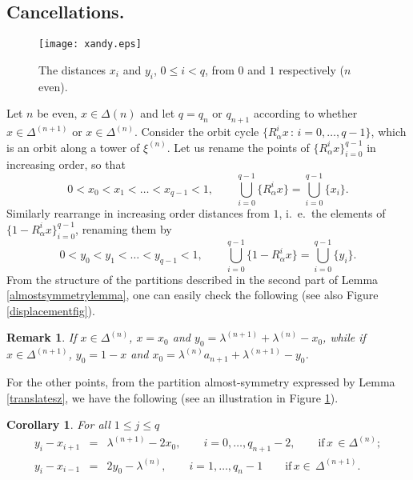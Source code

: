 \documentclass{conm-p-l}
\numberwithin{equation}{section}
\newtheorem{cor}[theorem]{Corollary}
\newtheorem{rem}[theorem]{Remark}
\begin{document}
\subsection{Cancellations.}\label{cancellations}
\begin{figure}
\centering
\texttt{[image: xandy.eps]}
\caption{The distances $x_i$ and $y_i$, $0\leq i < q$, from $0$ and $1$ respectively ($n$ even).\label{xandy}}
\end{figure}
Let $n$ be even, ${x}\in \Delta{(n)}$ and let $q=q_{n}$ or $q_{n+1}$ according to whether
${x}\in \Delta^{(n+1)}$ or ${x}\in \Delta^{(n)}$.  Consider the orbit cycle $\{R_{\alpha}^i {x}
{\, : \, } i=0, \dots, q-1\}$, which is an orbit along a tower of $\xi^{(n)}$. Let us rename the points of  $\{R_{\alpha}^i {x}\}_{i=0}^{q-1}$ in
increasing order, so that
\begin{equation*} 0<{x}_0 <x_1< \dots < x_{q-1}<1, \qquad \bigcup_{i=0}^{q-1} \{ R_{\alpha}^i
{x} \} = \bigcup_{i=0}^{q-1} \{ x_i \}.
\end{equation*}
Similarly rearrange in increasing order distances from $1$, i.~e.~the elements of
$\{1-R_{\alpha}^i {x}\}_{i=0}^{q-1}$, 
 renaming them by
\begin{equation*} 0<y_0 < y_1 < \dots < y_{q-1}<1,   \qquad \bigcup_{i=0}^{q-1} \{ 1-
R_{\alpha}^i {x} \} = \bigcup_{i=0}^{q-1} \{ y_i \}.
\end{equation*}
From the structure of the partitions described in the second part of Lemma \ref{almostsymmetrylemma}, one can easily check the following (see also Figure \ref{displacementfig}).
\begin{rem} \label{firstlastpoints}
If $x\in \Delta^{(n)}$, $x=x_0$ and $y_0= \lambda^{(n+1)} +\lambda^{(n)} - x_0$,
while if $x\in \Delta^{(n+1)}$, $y_0=1-x$ and $x_0= \lambda^{(n)}a_{n+1}
+\lambda^{(n+1)} - y_0$.
\end{rem}
For the other points, from the partition almost-symmetry expressed by Lemma
\ref{translatesz}, we have the following (see an illustration in Figure \ref{xandy}).
\begin{cor}\label{translatesxjyj}
For all $1\leq j \leq q$
\begin{eqnarray}
y_i  - x_{i+1} &=&  \lambda^{(n+1)} -  2 x_0, \qquad  i=0,\dots, q_{n+1}-2 ,
\qquad  \mathrm{if} \, x\,  \in \Delta^{(n)};\label{differencen}\\
y_i  - x_{i-1} &=&  2 y_0 -  \lambda^{(n)}
 ,  \qquad  i=1, \dots,  q_{n}-1 \qquad \mathrm{if}\,  x \in\,
\Delta^{(n+1)}.\label{differencen+1}
\end{eqnarray}
\end{cor}
\end{document}

